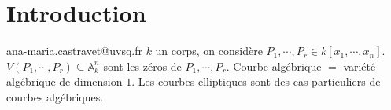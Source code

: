 \chapter*{Introduction}
    ana-maria.castravet@uvsq.fr
    $k$ un corps, on considère $P_1, \cdots, P_r \in k[x_1, \cdots, x_n]$. $V(P_1, \cdots, P_r) \subseteq \mathbb{A}_k^n$ sont les zéros de $P_1, \cdots, P_r$. Courbe algébrique $=$ variété algébrique de dimension $1$. Les courbes elliptiques sont des cas particuliers de courbes algébriques.